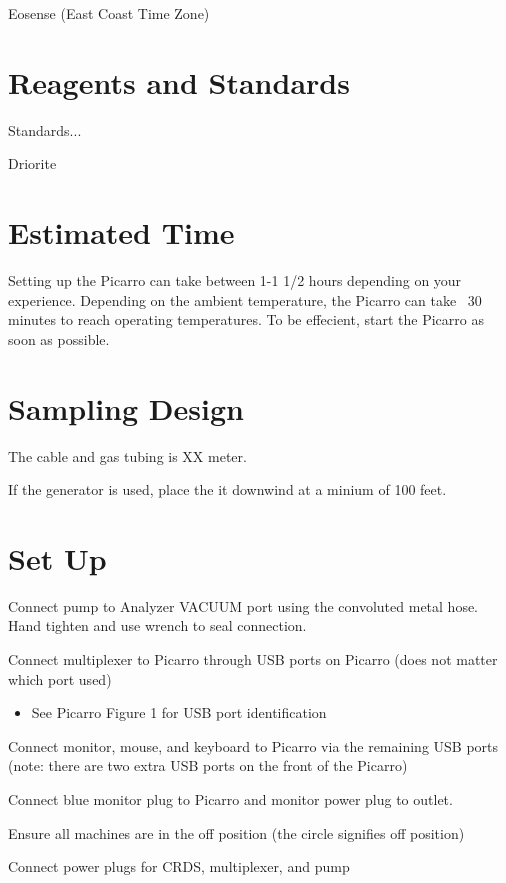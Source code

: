 \documentclass[12pt]{../SOP3}\usepackage[]{graphicx}\usepackage[]{color}
\begin{document}
\NP Eosense (East Coast Time Zone)


\section{Reagents and Standards}

\NP Standards..\cite{StandardMethods2012}.

\NP Driorite


\section{Estimated Time}

\NP Setting up the Picarro can take between 1-1 1/2 hours depending on your experience. Depending on the ambient temperature, the Picarro can take ~30 minutes to reach operating temperatures. To be effecient, start the Picarro as soon as possible.

\section{Sampling Design}

\NP The cable and gas tubing is XX meter.

\NP If the generator is used, place the it downwind at a minium of 100 feet.

\section{Set Up}

\NP Connect pump to Analyzer VACUUM port using the convoluted metal hose. Hand tighten and use wrench to seal connection.

\NP Connect multiplexer to Picarro through USB ports on Picarro (does not matter which port used)
\begin{itemize}
\item See Picarro Figure 1 for USB port identification
\end{itemize}

\NP Connect monitor, mouse, and keyboard to Picarro via the remaining USB ports (note: there are two extra USB ports on the front of the Picarro)

\NP Connect blue monitor plug to Picarro and monitor power plug to outlet.

\NP Ensure all machines are in the off position (the circle signifies off position)

\NP Connect power plugs for CRDS, multiplexer, and pump
\end{document}
